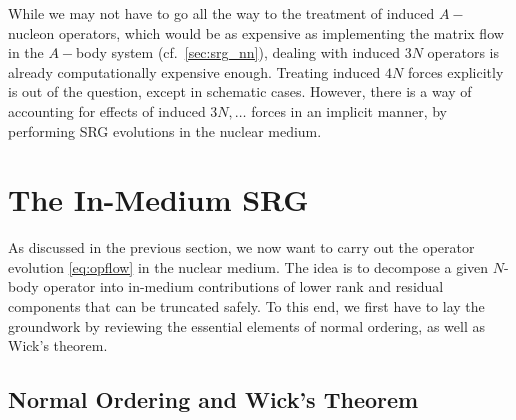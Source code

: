 {While we may not have to go all the way to the treatment of induced
$A-$nucleon operators, which would be as expensive as implementing 
the matrix flow in the $A-$body system (cf.~\ref{sec:srg_nn}),
dealing with induced $3N$ operators is already computationally 
expensive enough. Treating induced $4N$ forces explicitly is out 
of the question, except in schematic cases. However, there is a
way of accounting for effects of induced $3N,\ldots$ forces in
an implicit manner, by performing SRG evolutions in the nuclear
medium. 


\section{\label{sec:imsrg}The In-Medium SRG}
As discussed in the previous section, we now want to carry out the
operator evolution \eqref{eq:opflow} in the nuclear medium. The idea
is to decompose a given $N$-body operator into in-medium contributions
of lower rank and residual components that can be truncated safely. To
this end, we first have to lay the groundwork by reviewing the
essential elements of normal ordering, as well as Wick's theorem.

\subsection{\label{sec:nord}Normal Ordering and Wick's Theorem}

%
%
}
